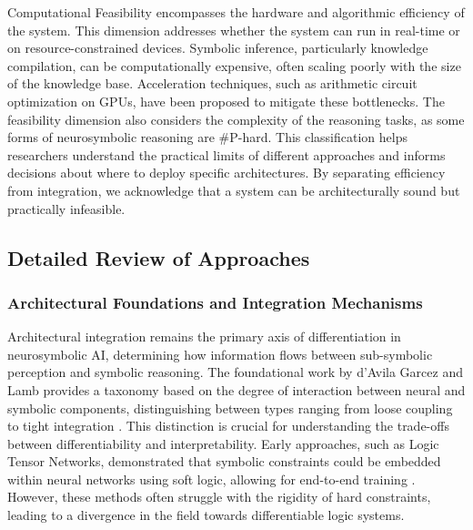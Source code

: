 \documentclass{article}
\begin{document}
Computational Feasibility encompasses the hardware and algorithmic efficiency of the system. This dimension addresses whether the system can run in real-time or on resource-constrained devices. Symbolic inference, particularly knowledge compilation, can be computationally expensive, often scaling poorly with the size of the knowledge base. Acceleration techniques, such as arithmetic circuit optimization on GPUs, have been proposed to mitigate these bottlenecks. The feasibility dimension also considers the complexity of the reasoning tasks, as some forms of neurosymbolic reasoning are \#P-hard. This classification helps researchers understand the practical limits of different approaches and informs decisions about where to deploy specific architectures. By separating efficiency from integration, we acknowledge that a system can be architecturally sound but practically infeasible.

\subsection{Detailed Review of Approaches}

\label{sec:detailed_review_of_approaches}

\subsubsection{Architectural Foundations and Integration Mechanisms}

\label{sec:architectural_foundations_and_integratio}

Architectural integration remains the primary axis of differentiation in neurosymbolic AI, determining how information flows between sub-symbolic perception and symbolic reasoning. The foundational work by d'Avila Garcez and Lamb provides a taxonomy based on the degree of interaction between neural and symbolic components, distinguishing between types ranging from loose coupling to tight integration \cite{garcez2020neurosymbolic}. This distinction is crucial for understanding the trade-offs between differentiability and interpretability. Early approaches, such as Logic Tensor Networks, demonstrated that symbolic constraints could be embedded within neural networks using soft logic, allowing for end-to-end training \cite{sridhar2022guaranteed}. However, these methods often struggle with the rigidity of hard constraints, leading to a divergence in the field towards differentiable logic systems.
\end{document}
